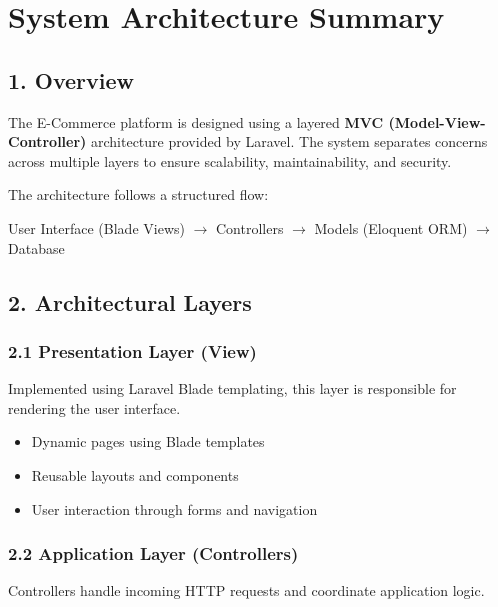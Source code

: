 \documentclass[12pt,a4paper]{article}
\begin{document}

\section{System Architecture Summary}

\subsection{1. Overview}

The E-Commerce platform is designed using a layered \textbf{MVC (Model-View-Controller)} architecture provided by Laravel. The system separates concerns across multiple layers to ensure scalability, maintainability, and security.

The architecture follows a structured flow:

\begin{center}
User Interface (Blade Views) $\rightarrow$ Controllers $\rightarrow$ Models (Eloquent ORM) $\rightarrow$ Database
\end{center}

\subsection{2. Architectural Layers}

\subsubsection{2.1 Presentation Layer (View)}

Implemented using Laravel Blade templating, this layer is responsible for rendering the user interface.

\begin{itemize}[noitemsep]
    \item Dynamic pages using Blade templates
    \item Reusable layouts and components
    \item User interaction through forms and navigation
\end{itemize}

\subsubsection{2.2 Application Layer (Controllers)}

Controllers handle incoming HTTP requests and coordinate application logic.
\end{document}
